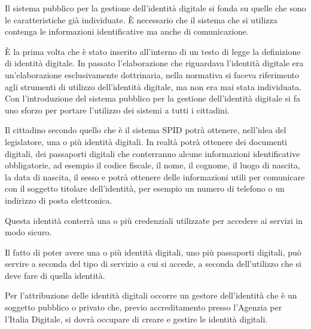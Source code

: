  Il sistema pubblico per la gestione dell'identità digitale si fonda su quelle che sono le caratteristiche già individuate. È necessario che il sistema che si utilizza contenga le informazioni identificative ma anche di comunicazione.\par
 È la prima volta che è stato inserito all'interno di un testo di legge la definizione di identità digitale. In passato l'elaborazione che riguardava l'identità digitale era un'elaborazione esclusivamente dottrinaria, nella normativa si faceva riferimento  agli strumenti di utilizzo dell'identità digitale, ma non era mai stata individuata. Con l'introduzione del sistema pubblico per la gestione dell'identità digitale si fa uno sforzo per portare l'utilizzo dei sistemi a tutti i cittadini.\par
 Il cittadino secondo quello che è il sistema SPID potrà ottenere, nell'idea del legislatore, una o più identità digitali. In realtà potrà ottenere dei documenti digitali, dei passaporti digitali che conterranno alcune informazioni identificative obbligatorie, ad esempio il codice fiscale, il nome, il cognome, il luogo di nascita, la data di nascita, il sesso e potrà ottenere delle informazioni utili per comunicare con il soggetto titolare dell'identità, per esempio un numero di telefono o un indirizzo di posta elettronica.\par
 Questa identità conterrà una o più credenziali utilizzate per accedere ai servizi in modo sicuro.\par
 
 Il fatto di poter avere una o più identità digitali, uno più passaporti digitali, può servire a seconda del tipo di servizio a cui si accede, a seconda dell'utilizzo che si deve fare di quella identità.\par
 Per l'attribuzione delle identità digitali occorre un gestore dell'identità che è un soggetto pubblico o privato che, previo accreditamento presso l'Agenzia per l'Italia Digitale, si dovrà occupare di creare e gestire le identità digitali.\par
 
